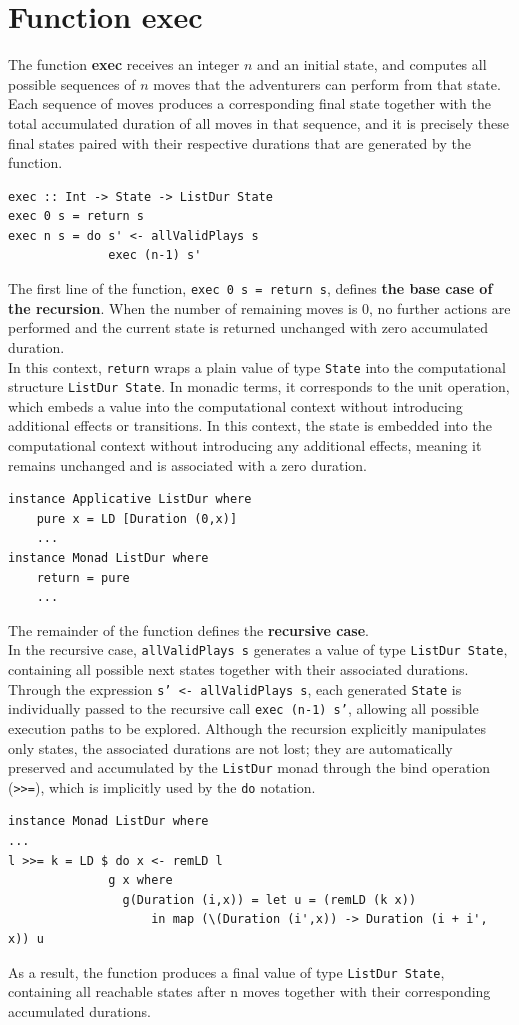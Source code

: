 \documentclass[a4paper,12pt]{report}
\begin{document}
\section{Function exec}
The function \textbf{exec} receives an integer $n$ and an initial state,
and computes all possible sequences of $n$ moves that the adventurers
can perform from that state. Each sequence of moves produces a
corresponding final state together with the total accumulated duration of
all moves in that sequence, and it is precisely these final states paired
with their respective durations that are generated by the function.
\begin{verbatim}
exec :: Int -> State -> ListDur State
exec 0 s = return s
exec n s = do s' <- allValidPlays s
              exec (n-1) s'
\end{verbatim}
The first line of the function, \texttt{exec 0 s = return s},
defines \textbf{the base case of the recursion}. When the number of
remaining moves is 0, no further actions are performed and the
current state is returned unchanged with zero accumulated duration.
\\[1em]
In this context, \texttt{return} wraps a plain value of type \texttt{State}
into the computational structure \texttt{ListDur State}. In monadic terms,
it corresponds to the unit operation, which embeds a value into the
computational context without introducing additional effects or transitions.
In this context, the state is embedded into the computational context
without introducing any additional effects, meaning it remains unchanged
and is associated with a zero duration.
\begin{verbatim}
instance Applicative ListDur where
    pure x = LD [Duration (0,x)]
    ...
instance Monad ListDur where
    return = pure
    ...
\end{verbatim}
The remainder of the function defines the \textbf{recursive case}.
\\[1em]
In the recursive case, \texttt{allValidPlays s} generates a value of type
\texttt{ListDur State}, containing all possible next states together with their
associated durations. Through the expression \texttt{s' <- allValidPlays s},
each generated \texttt{State} is individually passed to the recursive call
\texttt{exec (n-1) s'}, allowing all possible execution paths to be explored.
Although the recursion explicitly manipulates only states, the
associated durations are not lost; they are automatically preserved
and accumulated by the \texttt{ListDur} monad through the bind operation
(\texttt{>>=}), which is implicitly used by the \texttt{do} notation.
\begin{verbatim}
instance Monad ListDur where
...
l >>= k = LD $ do x <- remLD l
              g x where
                g(Duration (i,x)) = let u = (remLD (k x))
                    in map (\(Duration (i',x)) -> Duration (i + i', x)) u
\end{verbatim}
As a result, the function produces a final value of type \texttt{ListDur State},
containing all reachable states after n moves together with their
corresponding accumulated durations.
\end{document}
